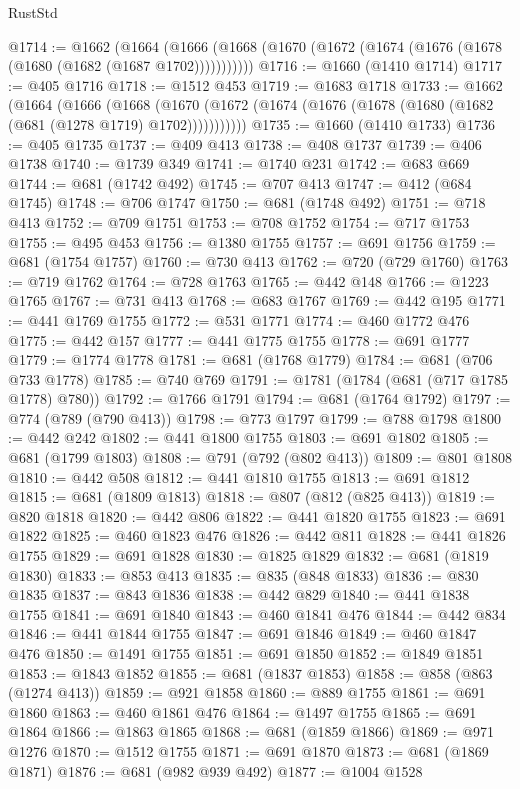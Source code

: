 \begin{lexlean}{RustStd}
\begin{coremodule}
{\begin{coremodule}
{{{{{{{{{{{{{{{{{{{{{{{{{{@1714 := @1662
    (@1664 (@1666 (@1668 (@1670 (@1672 (@1674 (@1676 (@1678 (@1680 (@1682 (@1687 @1702)))))))))))
@1716 := @1660 (@1410 @1714)
@1717 := @405 @1716
@1718 := @1512 @453
@1719 := @1683 @1718
@1733 := @1662
    (@1664
      (@1666
        (@1668 (@1670 (@1672 (@1674 (@1676 (@1678 (@1680 (@1682 (@681 (@1278 @1719) @1702)))))))))))
@1735 := @1660 (@1410 @1733)
@1736 := @405 @1735
@1737 := @409 @413
@1738 := @408 @1737
@1739 := @406 @1738
@1740 := @1739 @349
@1741 := @1740 @231
@1742 := @683 @669
@1744 := @681 (@1742 @492)
@1745 := @707 @413
@1747 := @412 (@684 @1745)
@1748 := @706 @1747
@1750 := @681 (@1748 @492)
@1751 := @718 @413
@1752 := @709 @1751
@1753 := @708 @1752
@1754 := @717 @1753
@1755 := @495 @453
@1756 := @1380 @1755
@1757 := @691 @1756
@1759 := @681 (@1754 @1757)
@1760 := @730 @413
@1762 := @720 (@729 @1760)
@1763 := @719 @1762
@1764 := @728 @1763
@1765 := @442 @148
@1766 := @1223 @1765
@1767 := @731 @413
@1768 := @683 @1767
@1769 := @442 @195
@1771 := @441 @1769 @1755
@1772 := @531 @1771
@1774 := @460 @1772 @476
@1775 := @442 @157
@1777 := @441 @1775 @1755
@1778 := @691 @1777
@1779 := @1774 @1778
@1781 := @681 (@1768 @1779)
@1784 := @681 (@706 @733 @1778)
@1785 := @740 @769
@1791 := @1781 (@1784 (@681 (@717 @1785 @1778) @780))
@1792 := @1766 @1791
@1794 := @681 (@1764 @1792)
@1797 := @774 (@789 (@790 @413))
@1798 := @773 @1797
@1799 := @788 @1798
@1800 := @442 @242
@1802 := @441 @1800 @1755
@1803 := @691 @1802
@1805 := @681 (@1799 @1803)
@1808 := @791 (@792 (@802 @413))
@1809 := @801 @1808
@1810 := @442 @508
@1812 := @441 @1810 @1755
@1813 := @691 @1812
@1815 := @681 (@1809 @1813)
@1818 := @807 (@812 (@825 @413))
@1819 := @820 @1818
@1820 := @442 @806
@1822 := @441 @1820 @1755
@1823 := @691 @1822
@1825 := @460 @1823 @476
@1826 := @442 @811
@1828 := @441 @1826 @1755
@1829 := @691 @1828
@1830 := @1825 @1829
@1832 := @681 (@1819 @1830)
@1833 := @853 @413
@1835 := @835 (@848 @1833)
@1836 := @830 @1835
@1837 := @843 @1836
@1838 := @442 @829
@1840 := @441 @1838 @1755
@1841 := @691 @1840
@1843 := @460 @1841 @476
@1844 := @442 @834
@1846 := @441 @1844 @1755
@1847 := @691 @1846
@1849 := @460 @1847 @476
@1850 := @1491 @1755
@1851 := @691 @1850
@1852 := @1849 @1851
@1853 := @1843 @1852
@1855 := @681 (@1837 @1853)
@1858 := @858 (@863 (@1274 @413))
@1859 := @921 @1858
@1860 := @889 @1755
@1861 := @691 @1860
@1863 := @460 @1861 @476
@1864 := @1497 @1755
@1865 := @691 @1864
@1866 := @1863 @1865
@1868 := @681 (@1859 @1866)
@1869 := @971 @1276
@1870 := @1512 @1755
@1871 := @691 @1870
@1873 := @681 (@1869 @1871)
@1876 := @681 (@982 @939 @492)
@1877 := @1004 @1528
}}}}}}}}}}}}}}}}}}}}}}}}}}
\end{coremodule}}
\end{coremodule}
\end{lexlean}
